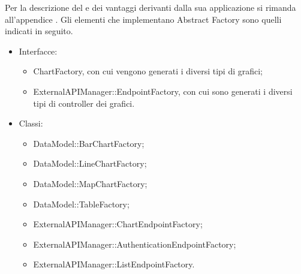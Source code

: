 		Per la descrizione del  e dei vantaggi derivanti dalla sua applicazione si rimanda all'appendice .
			Gli elementi che implementano Abstract Factory sono quelli indicati in seguito.
			\begin{itemize}
				\item Interfacce:
				\begin{itemize}
					\item ChartFactory, con cui vengono generati i diversi tipi di grafici;
					\item ExternalAPIManager::EndpointFactory, con cui sono generati i diversi tipi di controller dei grafici.
				\end{itemize}
				\item Classi:
				\begin{itemize}
					\item DataModel::BarChartFactory;
					\item DataModel::LineChartFactory;
					\item DataModel::MapChartFactory;
					\item DataModel::TableFactory;
					\item ExternalAPIManager::ChartEndpointFactory;
					\item ExternalAPIManager::AuthenticationEndpointFactory;
					\item ExternalAPIManager::ListEndpointFactory.
				\end{itemize}
			\end{itemize}